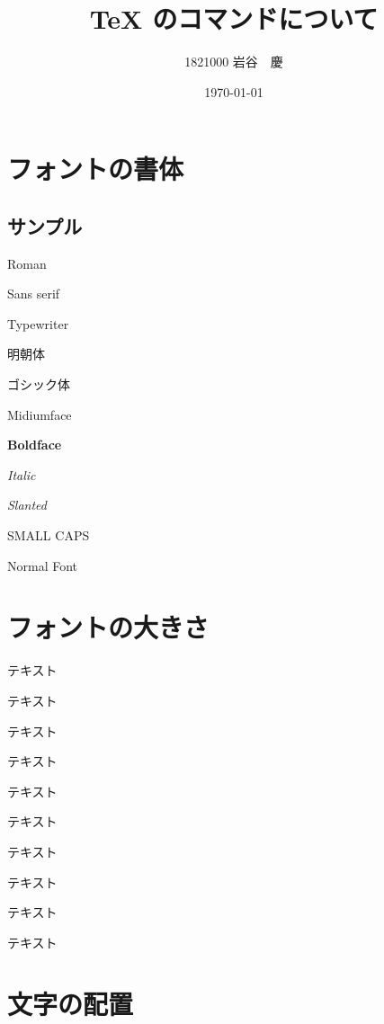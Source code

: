 \documentclass[12pt,a4j,twocolumn]{jarticle}
\title{TeX のコマンドについて}
\author{1821000 岩谷　慶}
\date{\today}
\begin{document}
\maketitle


\iffalse
複数行がまとめてコメントアウトされます。
この部分を表示させる場合は、
前後にあるコマンド（if, fi）の行を削除するか、
これらのコマンド自体をコメントアウトさせます。
\fi

\section{フォントの書体}
\subsection*{サンプル}
\hfill
{\rmfamily Roman }\par
{\sffamily Sans serif }\par
{\ttfamily Typewriter }\par
{\mcfamily 明朝体 }\par
{\gtfamily ゴシック体 }\par
{\mdseries Midiumface }\par
{\bfseries Boldface }\par
{\itshape Italic }\par
{\slshape Slanted }\par
{\scshape SMALL CAPS }\par
{\normalfont Normal Font }
\newpage
\section{フォントの大きさ}
\vfill
{\tiny テキスト}\par
{\scriptsize テキスト}\par
{\footnotesize テキスト}\par
{\small テキスト}\par
{\normalsize テキスト}\par
{\large テキスト}\par
{\Large テキスト}\par
{\LARGE テキスト}\par
{\huge テキスト}\par
{\Huge テキスト}

\section{文字の配置}
\end{document}
